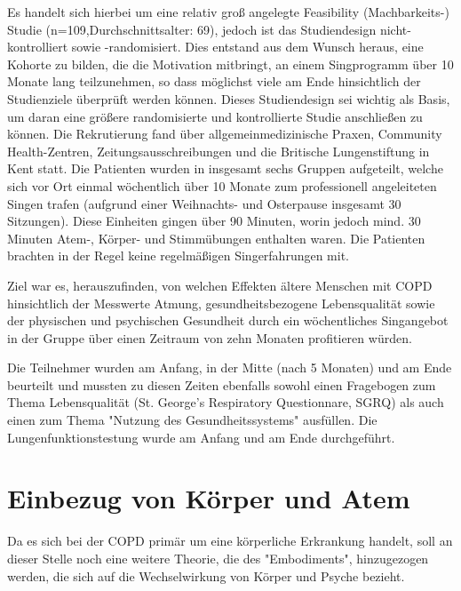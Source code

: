 Es handelt sich hierbei um eine relativ groß angelegte Feasibility (Machbarkeits-) Studie (n=109,Durchschnittsalter: 69), jedoch ist das Studiendesign nicht-kontrolliert sowie -randomisiert. Dies entstand aus dem Wunsch heraus, eine Kohorte zu bilden, die die Motivation mitbringt, an einem Singprogramm über 10 Monate lang teilzunehmen, so dass möglichst viele am Ende hinsichtlich der Studienziele überprüft werden können. Dieses Studiendesign sei wichtig als Basis, um daran eine größere randomisierte und kontrollierte Studie anschließen zu können. Die Rekrutierung fand über allgemeinmedizinische Praxen, Community Health-Zentren, Zeitungsausschreibungen und die Britische Lungenstiftung in Kent statt. Die Patienten wurden in insgesamt sechs Gruppen aufgeteilt, welche sich vor Ort einmal wöchentlich über 10 Monate zum professionell angeleiteten Singen trafen (aufgrund einer Weihnachts- und Osterpause insgesamt 30 Sitzungen). Diese Einheiten gingen über 90 Minuten, worin jedoch mind. 30 Minuten Atem-, Körper- und Stimmübungen enthalten waren. Die Patienten brachten in der Regel keine regelmäßigen Singerfahrungen mit.

Ziel war es, herauszufinden, von welchen Effekten ältere Menschen mit COPD hinsichtlich der Messwerte Atmung, gesundheitsbezogene Lebensqualität sowie der physischen und psychischen Gesundheit durch ein wöchentliches Singangebot in der Gruppe über einen Zeitraum von zehn Monaten profitieren würden. 

Die Teilnehmer wurden am Anfang, in der Mitte (nach 5 Monaten) und am Ende beurteilt und mussten zu diesen Zeiten ebenfalls sowohl einen Fragebogen zum Thema Lebensqualität (St. George's Respiratory Questionnare, SGRQ) als auch einen zum Thema "Nutzung des Gesundheitssystems" ausfüllen. Die Lungenfunktionstestung wurde am Anfang und am Ende durchgeführt. 


\section{Einbezug von Körper und Atem} 
\label{section:einbezug von koerper und atem}
Da es sich bei der COPD primär um eine körperliche Erkrankung handelt, soll an dieser Stelle noch eine weitere Theorie, die des "Embodiments", hinzugezogen werden, die sich auf die Wechselwirkung von Körper und Psyche bezieht. 

